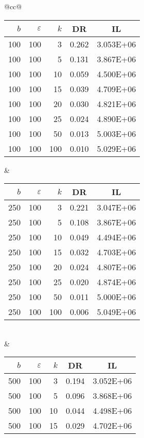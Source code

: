 \begin{table}[H]
	\centering
	\begin{tabular}{@{}cc@{}}
		\begin{tabular}{@{}rrrrr@{}}
			\toprule
			$b$ & $\varepsilon$ & $k$ & \multicolumn{1}{c}{DR} & \multicolumn{1}{c}{IL} \\ \midrule
			100	&	100	&	3	&	0.262	&	3.053E+06 \\
			100	&	100	&	5	&	0.131	&	3.867E+06 \\
			100	&	100	&	10	&	0.059	&	4.500E+06 \\
			100	&	100	&	15	&	0.039	&	4.709E+06 \\
			100	&	100	&	20	&	0.030	&	4.821E+06 \\
			100	&	100	&	25	&	0.024	&	4.890E+06 \\
			100	&	100	&	50	&	0.013	&	5.003E+06 \\
			100	&	100	&	100	&	0.010	&	5.029E+06 \\
		\end{tabular}
		&
		\begin{tabular}{@{}rrrrr@{}}
			\toprule
			$b$ & $\varepsilon$ & $k$ & \multicolumn{1}{c}{DR} & \multicolumn{1}{c}{IL} \\ \midrule
			250	&	100	&	3	&	0.221	&	3.047E+06 \\
			250	&	100	&	5	&	0.108	&	3.867E+06 \\
			250	&	100	&	10	&	0.049	&	4.494E+06 \\
			250	&	100	&	15	&	0.032	&	4.703E+06 \\
			250	&	100	&	20	&	0.024	&	4.807E+06 \\
			250	&	100	&	25	&	0.020	&	4.874E+06 \\
			250	&	100	&	50	&	0.011	&	5.000E+06 \\
			250	&	100	&	100	&	0.006	&	5.049E+06 \\
		\end{tabular}
		\\ & \\
		\begin{tabular}{@{}rrrrr@{}}
			\toprule
			$b$ & $\varepsilon$ & $k$ & \multicolumn{1}{c}{DR} & \multicolumn{1}{c}{IL} \\ \midrule
			500	&	100	&	3	&	0.194	&	3.052E+06 \\
			500	&	100	&	5	&	0.096	&	3.868E+06 \\
			500	&	100	&	10	&	0.044	&	4.498E+06 \\
			500	&	100	&	15	&	0.029	&	4.702E+06 \\

\end{tabular}
\end{tabular}
\end{table}
